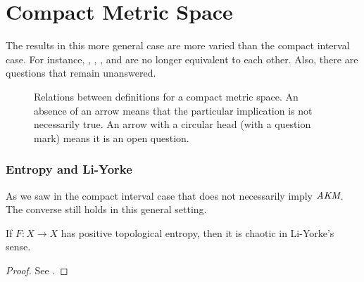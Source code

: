 \documentclass[10pt,twoside,draft]{book}
\begin{document}
\section{Compact Metric Space}
The results in this more general case are more varied than the compact interval case.
For instance, \dev, \wig, \blcp, and \akm are no longer equivalent to each other.
Also, there are questions that remain unanswered.
\begin{figure}[ht]
  \centering
  \label{fig:chaos-metric}
  \caption{
    Relations between definitions for a compact metric space.
    An absence of an arrow means that the particular implication is not necessarily true.
    An arrow with a circular head (with a question mark) means it is an open question.
  }
\end{figure}

\subsubsection*{Entropy and Li-Yorke}
As we saw in the compact interval case that \liy does not necessarily imply $\emph{AKM}$.
The converse still holds in this general setting.
\begin{theorem}
  If $F: X \to X$ has positive topological entropy, then it is chaotic in Li-Yorke's sense.
  \label{thm:ent-liy}
  \begin{proof}
    See \citet{blanchard}.
  \end{proof}
\end{theorem}
\end{document}
